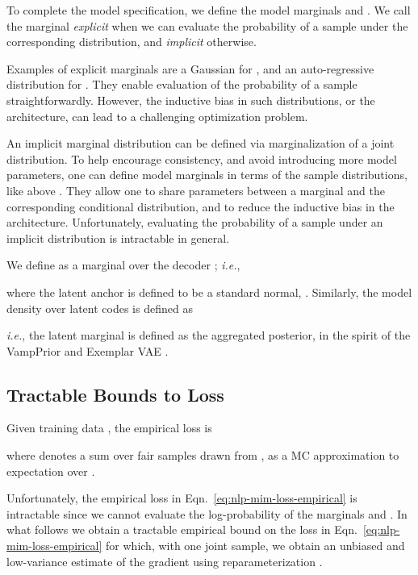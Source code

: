\documentclass{article}
\newcommand{\ie}{{\em i.e.}}
\begin{document}
To complete the model specification, we define the model marginals  and .
We call the marginal {\it explicit}  when we can evaluate the probability of a sample 
under the corresponding distribution, and {\it implicit} otherwise.

Examples of explicit marginals are a Gaussian for , and an auto-regressive distribution for . 
They enable evaluation of the probability of a sample straightforwardly. 
However, the inductive bias in such distributions, or the architecture, can lead to a  challenging optimization problem. 


An implicit marginal distribution can be defined via marginalization of a joint distribution.  
To help encourage consistency, and avoid introducing more model parameters, one can
define model marginals in terms of the sample distributions, like  above \citep{DBLP:journals/corr/BornscheinSFB15,2019arXiv191003175L,DBLP:journals/corr/TomczakW17}.
They allow one to share parameters between a marginal and the corresponding conditional distribution, 
and to reduce the inductive bias in the architecture. 
Unfortunately, evaluating the probability of a sample under an implicit distribution is intractable in general.

We define  as a marginal over the decoder \cite{DBLP:journals/corr/BornscheinSFB15}; \ie,

where the latent anchor is defined to be a standard normal, .
Similarly, the model density over latent codes is defined as

\ie, the latent marginal is defined as the aggregated posterior, in the spirit of the 
VampPrior \cite{DBLP:journals/corr/TomczakW17} and Exemplar VAE \cite{ExemplarVAE2020}.




\subsection{Tractable Bounds to Loss}

Given training data , the empirical loss is

where  denotes a sum over  fair samples drawn from , 
as a MC approximation to expectation over .

Unfortunately, the empirical loss in Eqn.\ \eqref{eq:nlp-mim-loss-empirical} is intractable since we
cannot evaluate the log-probability of the marginals  and .
In what follows we obtain a tractable empirical bound on the loss in Eqn.\ \eqref{eq:nlp-mim-loss-empirical}
for which, with one joint sample, we obtain an unbiased and low-variance estimate of the gradient using reparameterization \cite{Kingma2013}.
\end{document}
